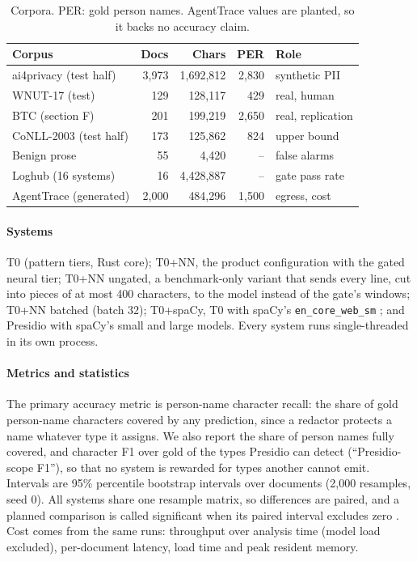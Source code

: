 \documentclass[conference]{IEEEtran}
\begin{document}
\begin{table}[t]
\caption{Corpora. PER: gold person names. AgentTrace values are planted, so it backs no accuracy claim.}\label{tab:corpora}
\centering\footnotesize\setlength{\tabcolsep}{3pt}
\begin{tabular}{@{}l r r r l@{}}
\toprule
Corpus & Docs & Chars & PER & Role \\
\midrule
ai4privacy (test half) & 3,973 & 1,692,812 & 2,830 & synthetic PII \\
WNUT-17 (test) & 129 & 128,117 & 429 & real, human \\
BTC (section F) & 201 & 199,219 & 2,650 & real, replication \\
CoNLL-2003 (test half) & 173 & 125,862 & 824 & upper bound \\
Benign prose & 55 & 4,420 & -- & false alarms \\
Loghub (16 systems) & 16 & 4,428,887 & -- & gate pass rate \\
AgentTrace (generated) & 2,000 & 484,296 & 1,500 & egress, cost \\
\bottomrule
\end{tabular}
\end{table}

\paragraph{Systems} T0 (pattern tiers, Rust core); T0+NN, the product configuration with the gated neural tier; T0+NN ungated, a benchmark-only variant that sends every line, cut into pieces of at most 400 characters, to the model instead of the gate's windows; T0+NN batched (batch 32); T0+spaCy, T0 with spaCy's \texttt{en\_core\_web\_sm} \cite{honnibal2020spacy}; and Presidio \cite{presidio} with spaCy's small and large models. Every system runs single-threaded in its own process.

\paragraph{Metrics and statistics} The primary accuracy metric is person-name character recall: the share of gold person-name characters covered by any prediction, since a redactor protects a name whatever type it assigns. We also report the share of person names fully covered, and character F1 over gold of the types Presidio can detect (``Presidio-scope F1''), so that no system is rewarded for types another cannot emit. Intervals are 95\% percentile bootstrap intervals over documents (2,000 resamples, seed 0). All systems share one resample matrix, so differences are paired, and a planned comparison is called significant when its paired interval excludes zero \cite{efron1993bootstrap}. Cost comes from the same runs: throughput over analysis time (model load excluded), per-document latency, load time and peak resident memory.
\end{document}
